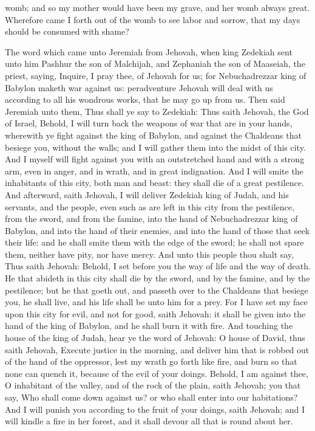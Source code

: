 womb; and so my mother would have been my grave, and her womb always great. Wherefore came I forth out of the womb to see labor and sorrow, that my days should be consumed with shame? 

The word which came unto Jeremiah from Jehovah, when king Zedekiah sent unto him Pashhur the son of Malchijah, and Zephaniah the son of Maaseiah, the priest, saying, Inquire, I pray thee, of Jehovah for us; for Nebuchadrezzar king of Babylon maketh war against us: peradventure Jehovah will deal with us according to all his wondrous works, that he may go up from us.  Then said Jeremiah unto them, Thus shall ye say to Zedekiah: Thus saith Jehovah, the God of Israel, Behold, I will turn back the weapons of war that are in your hands, wherewith ye fight against the king of Babylon, and against the Chaldeans that besiege you, without the walls; and I will gather them into the midst of this city. And I myself will fight against you with an outstretched hand and with a strong arm, even in anger, and in wrath, and in great indignation. And I will smite the inhabitants of this city, both man and beast: they shall die of a great pestilence. And afterward, saith Jehovah, I will deliver Zedekiah king of Judah, and his servants, and the people, even such as are left in this city from the pestilence, from the sword, and from the famine, into the hand of Nebuchadrezzar king of Babylon, and into the hand of their enemies, and into the hand of those that seek their life: and he shall smite them with the edge of the sword; he shall not spare them, neither have pity, nor have mercy.  And unto this people thou shalt say, Thus saith Jehovah: Behold, I set before you the way of life and the way of death. He that abideth in this city shall die by the sword, and by the famine, and by the pestilence; but he that goeth out, and passeth over to the Chaldeans that besiege you, he shall live, and his life shall be unto him for a prey. For I have set my face upon this city for evil, and not for good, saith Jehovah: it shall be given into the hand of the king of Babylon, and he shall burn it with fire.  And touching the house of the king of Judah, hear ye the word of Jehovah: O house of David, thus saith Jehovah, Execute justice in the morning, and deliver him that is robbed out of the hand of the oppressor, lest my wrath go forth like fire, and burn so that none can quench it, because of the evil of your doings. Behold, I am against thee, O inhabitant of the valley, and of the rock of the plain, saith Jehovah; you that say, Who shall come down against us? or who shall enter into our habitations? And I will punish you according to the fruit of your doings, saith Jehovah; and I will kindle a fire in her forest, and it shall devour all that is round about her. 

